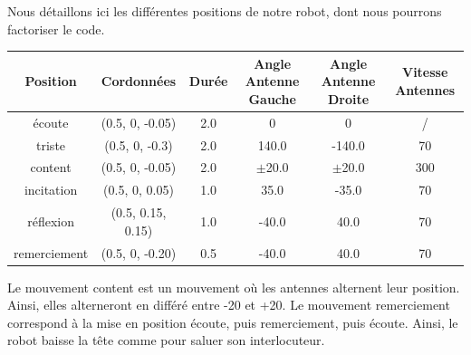 Nous détaillons ici les différentes positions de notre robot, dont nous pourrons factoriser le code.
\begin{center}
    \begin{tabular}{| c | c | c | c | c | c |}
        \hline
        Position & Cordonnées & Durée & Angle Antenne Gauche & Angle Antenne Droite & Vitesse Antennes \\
        \hline
        écoute & (0.5, 0, -0.05) & 2.0 & 0 & 0 & / \\
        triste & (0.5, 0, -0.3) & 2.0 & 140.0 & -140.0 & 70 \\
        content & (0.5, 0, -0.05) & 2.0 & $\pm$20.0 & $\pm$20.0 & 300 \\
        incitation & (0.5, 0, 0.05) & 1.0 & 35.0 & -35.0 & 70 \\
        réflexion & (0.5, 0.15, 0.15) & 1.0 & -40.0 & 40.0 & 70 \\
        remerciement & (0.5, 0, -0.20) & 0.5 & -40.0 & 40.0 & 70 \\
        \hline
    \end{tabular}
\end{center}

Le mouvement content est un mouvement où les antennes alternent leur position. Ainsi, elles alterneront en différé entre -20 et +20.
Le mouvement remerciement correspond à la mise en position écoute, puis remerciement, puis écoute. Ainsi, le robot baisse la tête comme pour saluer son interlocuteur.

